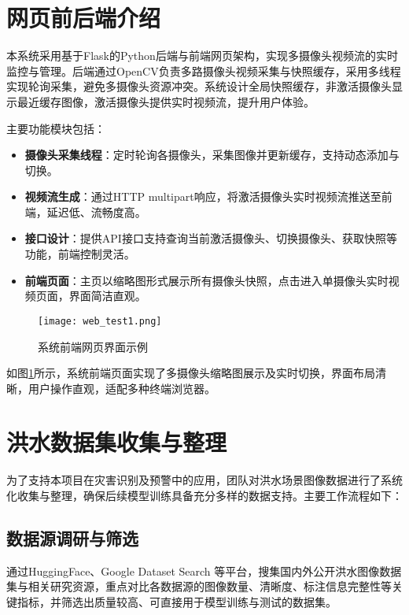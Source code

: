 \section{网页前后端介绍}

本系统采用基于Flask的Python后端与前端网页架构，实现多摄像头视频流的实时监控与管理。后端通过OpenCV负责多路摄像头视频采集与快照缓存，采用多线程实现轮询采集，避免多摄像头资源冲突。系统设计全局快照缓存，非激活摄像头显示最近缓存图像，激活摄像头提供实时视频流，提升用户体验。

主要功能模块包括：

\begin{itemize}[leftmargin=*]
  \item \textbf{摄像头采集线程}：定时轮询各摄像头，采集图像并更新缓存，支持动态添加与切换。
  \item \textbf{视频流生成}：通过HTTP multipart响应，将激活摄像头实时视频流推送至前端，延迟低、流畅度高。
  \item \textbf{接口设计}：提供API接口支持查询当前激活摄像头、切换摄像头、获取快照等功能，前端控制灵活。
  \item \textbf{前端页面}：主页以缩略图形式展示所有摄像头快照，点击进入单摄像头实时视频页面，界面简洁直观。
\end{itemize}

\begin{figure}[H]
    \centering
    \texttt{[image: web\_test1.png]}
    \caption{系统前端网页界面示例}
    \label{fig:web_test1}
\end{figure}

如图\ref{fig:web_test1}所示，系统前端页面实现了多摄像头缩略图展示及实时切换，界面布局清晰，用户操作直观，适配多种终端浏览器。

\section{洪水数据集收集与整理}

为了支持本项目在灾害识别及预警中的应用，团队对洪水场景图像数据进行了系统化收集与整理，确保后续模型训练具备充分多样的数据支持。主要工作流程如下：

\subsection{数据源调研与筛选}

通过HuggingFace、Google Dataset Search 等平台，搜集国内外公开洪水图像数据集与相关研究资源，重点对比各数据源的图像数量、清晰度、标注信息完整性等关键指标，并筛选出质量较高、可直接用于模型训练与测试的数据集。

